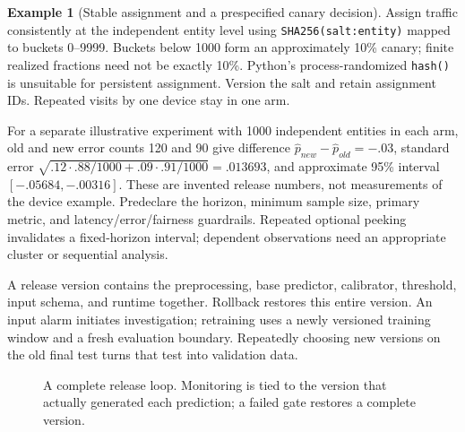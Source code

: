 \documentclass[11pt,twoside]{article}
\numberwithin{equation}{section}
\theoremstyle{plain}
\theoremstyle{definition}
\newtheorem{example}[theorem]{Example}
\theoremstyle{remark}
\begin{document}
\begin{example}[Stable assignment and a prespecified canary decision]
Assign traffic consistently at the independent entity level using
\texttt{SHA256(salt:entity)} mapped to buckets 0--9999. Buckets below 1000
form an approximately 10\% canary; finite realized fractions need not be
exactly 10\%. Python's process-randomized \texttt{hash()} is unsuitable for
persistent assignment. Version the salt and retain assignment IDs. Repeated
visits by one device stay in one arm.

For a separate illustrative experiment with 1000 independent entities in each
arm, old and new error counts 120 and 90 give difference
$\hat p_{new}-\hat p_{old}=-.03$, standard error
$\sqrt{.12\cdot.88/1000+.09\cdot.91/1000}=.013693$, and approximate
95\% interval $[-.05684,-.00316]$. These are invented release numbers,
not measurements of the device example. Predeclare the horizon, minimum
sample size, primary metric, and latency/error/fairness guardrails. Repeated
optional peeking invalidates a fixed-horizon interval; dependent observations
need an appropriate cluster or sequential analysis.

A release version contains the preprocessing, base predictor, calibrator,
threshold, input schema, and runtime together. Rollback restores this entire
version. An input alarm initiates investigation; retraining uses a newly
versioned training window and a fresh evaluation boundary. Repeatedly choosing
new versions on the old final test turns that test into validation data.
\end{example}
\begin{figure}[H]\centering
{}
\caption{A complete release loop. Monitoring is tied to the version that
actually generated each prediction; a failed gate restores a complete version.}
\end{figure}
\end{document}
